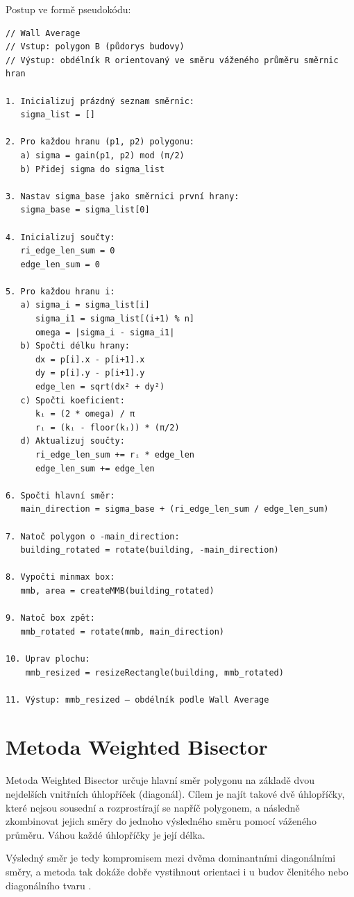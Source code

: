 \documentclass[a4paper,12pt]{article}
\begin{document}
Postup ve formě pseudokódu:
\begin{verbatim}
// Wall Average
// Vstup: polygon B (půdorys budovy)
// Výstup: obdélník R orientovaný ve směru váženého průměru směrnic hran

1. Inicializuj prázdný seznam směrnic:
   sigma_list = []

2. Pro každou hranu (p1, p2) polygonu:
   a) sigma = gain(p1, p2) mod (π/2)
   b) Přidej sigma do sigma_list

3. Nastav sigma_base jako směrnici první hrany:
   sigma_base = sigma_list[0]

4. Inicializuj součty:
   ri_edge_len_sum = 0
   edge_len_sum = 0

5. Pro každou hranu i:
   a) sigma_i = sigma_list[i]
      sigma_i1 = sigma_list[(i+1) % n]
      omega = |sigma_i - sigma_i1|
   b) Spočti délku hrany:
      dx = p[i].x - p[i+1].x
      dy = p[i].y - p[i+1].y
      edge_len = sqrt(dx² + dy²)
   c) Spočti koeficient:
      kᵢ = (2 * omega) / π
      rᵢ = (kᵢ - floor(kᵢ)) * (π/2)
   d) Aktualizuj součty:
      ri_edge_len_sum += rᵢ * edge_len
      edge_len_sum += edge_len

6. Spočti hlavní směr:
   main_direction = sigma_base + (ri_edge_len_sum / edge_len_sum)

7. Natoč polygon o -main_direction:
   building_rotated = rotate(building, -main_direction)

8. Vypočti minmax box:
   mmb, area = createMMB(building_rotated)

9. Natoč box zpět:
   mmb_rotated = rotate(mmb, main_direction)

10. Uprav plochu:
    mmb_resized = resizeRectangle(building, mmb_rotated)

11. Výstup: mmb_resized – obdélník podle Wall Average
\end{verbatim}

\section{Metoda Weighted Bisector}
Metoda Weighted Bisector určuje hlavní směr polygonu na základě dvou nejdelších vnitřních úhlopříček (diagonál). Cílem je najít takové dvě úhlopříčky, které nejsou sousední a rozprostírají se napříč polygonem, a následně zkombinovat jejich směry do jednoho výsledného směru pomocí váženého průměru. Váhou každé úhlopříčky je její délka.

Výsledný směr je tedy kompromisem mezi dvěma dominantními diagonálními směry, a metoda tak dokáže dobře vystihnout orientaci i u budov členitého nebo diagonálního tvaru \parencite{bayer_prednaska}.
\end{document}
